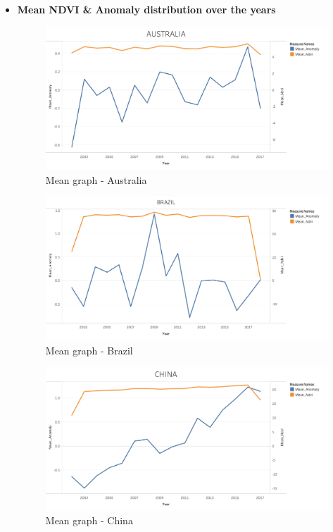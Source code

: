 \newpage

\begin{itemize}
    \item \textbf{Mean NDVI \& Anomaly distribution over the years}
    
     \begin{figure}[H]
            \centering
            \includegraphics[width=1.0\linewidth]{figures/ch5/Mean/AUSTRALIA_mean.png}
            \caption{Mean graph - Australia}\label{Fig:AUSTRALIA_mean}
    \end{figure}
    
    \begin{figure}[H]
            \centering
            \includegraphics[width=1.0\linewidth]{figures/ch5/Mean/BRAZIL_mean.png}
            \caption{Mean graph - Brazil}\label{Fig:BRAZIL_mean}
    \end{figure}
    
    \begin{figure}[H]
            \centering
            \includegraphics[width=1.0\linewidth]{figures/ch5/Mean/CHINA_mean.png}
            \caption{Mean graph - China}\label{Fig:CHINA_mean}
    \end{figure}
    

\end{itemize}
